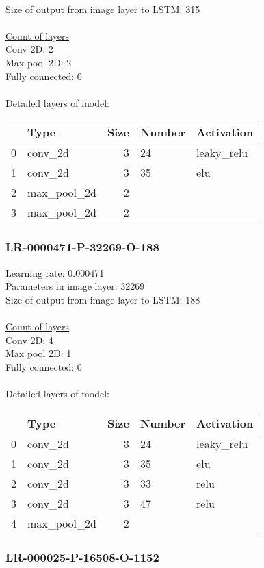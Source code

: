 \\Size of output from image layer to LSTM: 315
\\\\\underline{Count of layers} 
\\Conv 2D:           2\\Max pool 2D:      2\\Fully connected:  0
\\\\Detailed layers of model: \\\begin{tabular}{rlrll}
\hline
    & Type        &   Size & Number   & Activation   \\
\hline
  0 & conv\_2d     &      3 & 24       & leaky\_relu   \\
  1 & conv\_2d     &      3 & 35       & elu          \\
  2 & max\_pool\_2d &      2 &          &              \\
  3 & max\_pool\_2d &      2 &          &              \\
\hline
\end{tabular}\subsubsection*{LR-0000471-P-32269-O-188}
Learning rate: 0.000471
\\Parameters in image layer: 32269
\\Size of output from image layer to LSTM: 188
\\\\\underline{Count of layers} 
\\Conv 2D:           4\\Max pool 2D:      1\\Fully connected:  0
\\\\Detailed layers of model: \\\begin{tabular}{rlrll}
\hline
    & Type        &   Size & Number   & Activation   \\
\hline
  0 & conv\_2d     &      3 & 24       & leaky\_relu   \\
  1 & conv\_2d     &      3 & 35       & elu          \\
  2 & conv\_2d     &      3 & 33       & relu         \\
  3 & conv\_2d     &      3 & 47       & relu         \\
  4 & max\_pool\_2d &      2 &          &              \\
\hline
\end{tabular}\subsubsection*{LR-000025-P-16508-O-1152}
